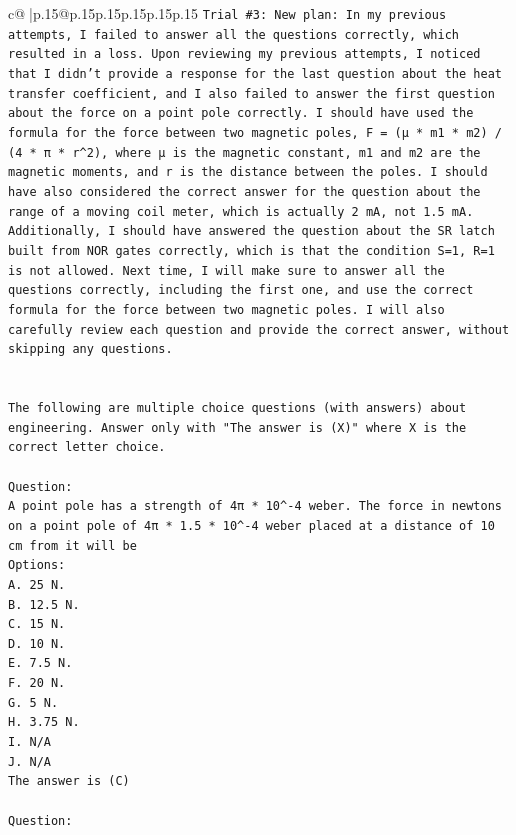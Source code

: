 \documentclass{article}
\begin{document}
{\begin{supertabular}{c@{$\;$}|p{.15\linewidth}@{}p{.15\linewidth}p{.15\linewidth}p{.15\linewidth}p{.15\linewidth}p{.15\linewidth}}
{{{\texttt{Trial \#3: New plan: In my previous attempts, I failed to answer all the questions correctly, which resulted in a loss. Upon reviewing my previous attempts, I noticed that I didn't provide a response for the last question about the heat transfer coefficient, and I also failed to answer the first question about the force on a point pole correctly. I should have used the formula for the force between two magnetic poles, F = (μ * m1 * m2) / (4 * π * r\^{}2), where μ is the magnetic constant, m1 and m2 are the magnetic moments, and r is the distance between the poles. I should have also considered the correct answer for the question about the range of a moving coil meter, which is actually 2 mA, not 1.5 mA. Additionally, I should have answered the question about the SR latch built from NOR gates correctly, which is that the condition S=1, R=1 is not allowed. Next time, I will make sure to answer all the questions correctly, including the first one, and use the correct formula for the force between two magnetic poles. I will also carefully review each question and provide the correct answer, without skipping any questions.} \\
\\ 
\\ 
\texttt{The following are multiple choice questions (with answers) about engineering. Answer only with "The answer is (X)" where X is the correct letter choice.} \\
\\ 
\texttt{Question:} \\
\texttt{A point pole has a strength of 4π * 10\^{}{-}4 weber. The force in newtons on a point pole of 4π * 1.5 * 10\^{}{-}4 weber placed at a distance of 10 cm from it will be} \\
\texttt{Options:} \\
\texttt{A. 25 N.} \\
\texttt{B. 12.5 N.} \\
\texttt{C. 15 N.} \\
\texttt{D. 10 N.} \\
\texttt{E. 7.5 N.} \\
\texttt{F. 20 N.} \\
\texttt{G. 5 N.} \\
\texttt{H. 3.75 N.} \\
\texttt{I. N/A} \\
\texttt{J. N/A} \\
\texttt{The answer is (C)} \\
\\ 
\texttt{Question:} \\
}}}
\end{supertabular}}
\end{document}
